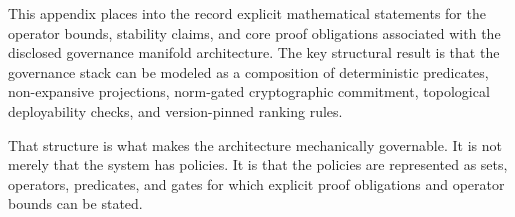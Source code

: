 \documentclass[11pt]{article}
\begin{document}
This appendix places into the record explicit mathematical statements for the operator bounds, stability claims, and core proof obligations associated with the disclosed governance manifold architecture. The key structural result is that the governance stack can be modeled as a composition of deterministic predicates, non-expansive projections, norm-gated cryptographic commitment, topological deployability checks, and version-pinned ranking rules.

That structure is what makes the architecture mechanically governable. It is not merely that the system has policies. It is that the policies are represented as sets, operators, predicates, and gates for which explicit proof obligations and operator bounds can be stated.

\nocite{*}


\end{document}
